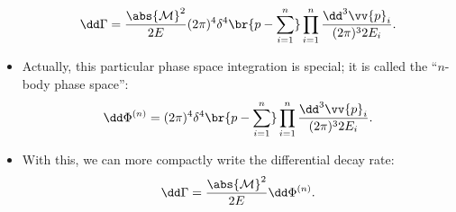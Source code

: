 \begin{itemize}
\begin{equation}
            \dd\Gamma = \frac{\abs{\mathcal{M}}^2}{2E} (2\pi)^4 \delta^4\br{p - \sum_{i=1}^n} \prod_{i=1}^n \frac{\dd^3\vv{p}_i}{(2\pi)^3 2E_i}.
        \end{equation}
    \item Actually, this particular phase space integration is special; it is called the ``$n$-body phase space'':
        \begin{equation}
            \dd\Phi^{(n)} = (2\pi)^4 \delta^4\br{p - \sum_{i=1}^n} \prod_{i=1}^n \frac{\dd^3\vv{p}_i}{(2\pi)^3 2E_i}.
        \end{equation}
    \item With this, we can more compactly write the differential decay rate:
        \begin{equation}
            \dd\Gamma = \frac{\abs{\mathcal{M}}^2}{2E} \dd\Phi^{(n)}.
        \end{equation}
\end{itemize}



